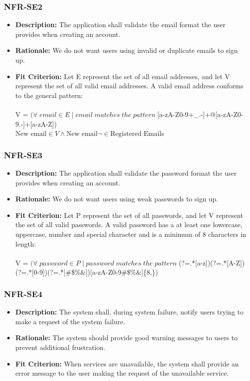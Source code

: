 \documentclass[12pt]{article}
\begin{document}
\subsubsection*{NFR-SE2}
\begin{itemize}
  \item \textbf{Description:} The application shall validate the email format the user provides when creating an account.
  \item \textbf{Rationale:} We do not want users using invalid or duplicate emails to sign up.
  \item \textbf{Fit Criterion:} Let E represent the set of all email addresses, and let V represent the set of all valid email addresses. A valid email address conforms to the general pattern:\\\\
  V = $(\forall\; email \in E\;  |\; email \; matches \; the \; pattern \; $[a-zA-Z0-9+\_.-]+@[a-zA-Z0-9.-]+[a-zA-Z])\\
  $\text{New email} \in V \land \text{New email} \neg \in \text{Registered Emails}$
\end{itemize}
\subsubsection*{NFR-SE3}
\begin{itemize}
  \item \textbf{Description:} The application shall validate the password format the user provides when creating an account.
  \item \textbf{Rationale:} We do not want users using weak passwords to sign up.
  \item \textbf{Fit Criterion:} Let P represent the set of all passwords, and let V represent the set of all valid passwords. A valid password has a at least one lowercase, uppercase, number and special character and is a minimum of 8 characters in length:\\\\
  V = $(\forall\; password \in P\;  |\; password \; matches \; the \; pattern \; $(?=.*[a-z])(?=.*[A-Z])(?=.*[0-9])(?=.*[\#\$\%\&\*\@])[a-zA-Z0-9\#\$\%\&\*\@]\{8,\})\\
\end{itemize}
\subsubsection*{NFR-SE4}
\begin{itemize}
  \item \textbf{Description:} The system shall, during system failure, notify users trying to make a request of the system failure.
  \item \textbf{Rationale:} The system should provide good warning messages to users to prevent additional frustration.
  \item \textbf{Fit Criterion:} When services are unavailable, the system shall provide an error message to the user making the request of the unavailable service.
\end{itemize}
\end{document}

